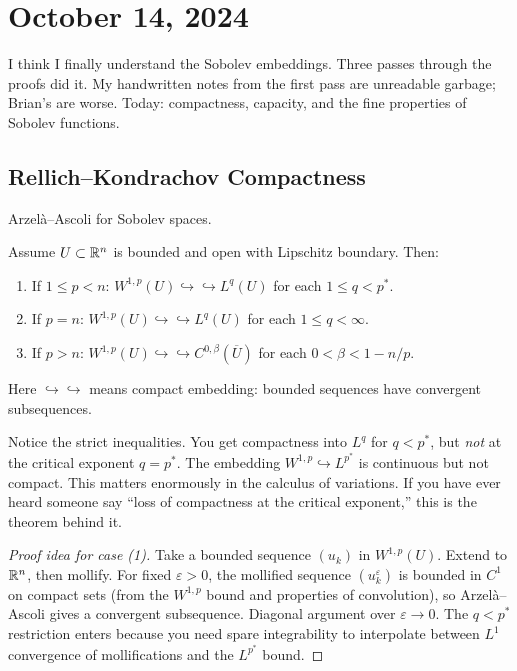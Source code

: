 \section{October 14, 2024}

I think I finally understand the Sobolev embeddings. Three passes through the proofs did it. My handwritten notes from the first pass are unreadable garbage; Brian's are worse. Today: compactness, capacity, and the fine properties of Sobolev functions.

\subsection{Rellich--Kondrachov Compactness}
\label{thm:rellich-kondrachov}

Arzel\`a--Ascoli for Sobolev spaces.

\begin{theorem}
\label{thm:rellich}
Assume $U \subset \mathbb{R}^n$ is bounded and open with Lipschitz boundary. Then:
\begin{enumerate}
    \item If $1 \leq p < n$: $W^{1,p}(U) \hookrightarrow\hookrightarrow L^q(U)$ for each $1 \leq q < p^*$.
    \item If $p = n$: $W^{1,p}(U) \hookrightarrow\hookrightarrow L^q(U)$ for each $1 \leq q < \infty$.
    \item If $p > n$: $W^{1,p}(U) \hookrightarrow\hookrightarrow C^{0,\beta}(\overline{U})$ for each $0 < \beta < 1 - n/p$.
\end{enumerate}
Here $\hookrightarrow\hookrightarrow$ means compact embedding: bounded sequences have convergent subsequences.
\end{theorem}

Notice the strict inequalities. You get compactness into $L^q$ for $q < p^*$, but \emph{not} at the critical exponent $q = p^*$. The embedding $W^{1,p} \hookrightarrow L^{p^*}$ is continuous but not compact. This matters enormously in the calculus of variations. If you have ever heard someone say ``loss of compactness at the critical exponent,'' this is the theorem behind it.

\begin{proof}[Proof idea for case (1)]
Take a bounded sequence $(u_k)$ in $W^{1,p}(U)$. Extend to $\mathbb{R}^n$, then mollify. For fixed $\varepsilon > 0$, the mollified sequence $(u_k^\varepsilon)$ is bounded in $C^1$ on compact sets (from the $W^{1,p}$ bound and properties of convolution), so Arzel\`a--Ascoli gives a convergent subsequence. Diagonal argument over $\varepsilon \to 0$. The $q < p^*$ restriction enters because you need spare integrability to interpolate between $L^1$ convergence of mollifications and the $L^{p^*}$ bound.
\end{proof}

